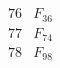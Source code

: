 \documentclass{article}
\begin{document}
{$$\begin{array}{|r|*{7}{r|}}
 & 
 & 
\\
\hline
76 
 & F_{36} &
 & 
 & 
 & 
 & 
 & 
\\
\hline
77 
 & F_{74} &
 & 
 & 
 & 
 & 
 & 
\\
\hline
78 
 & F_{98} &
 & 

\end{array}$$}
\end{document}

